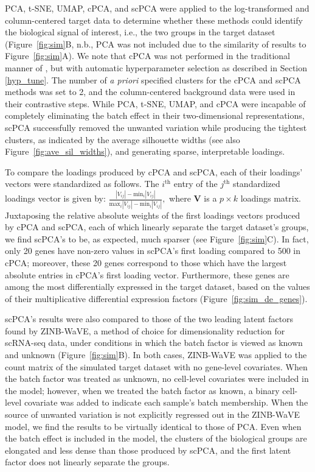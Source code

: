 PCA, t-SNE, UMAP, cPCA, and scPCA were applied to the log-transformed and column-centered target data to determine whether these methods could identify the biological signal of interest, i.e., the two groups in the target dataset (Figure~\ref{fig:sim}B, n.b., PCA was not included due to the similarity of results to Figure~\ref{fig:sim}A). We note that cPCA was not performed in the traditional manner of \citet{Abid2018}, but with automatic hyperparameter selection as described in Section \ref{hyp_tune}. The number of \textit{a priori} specified clusters for the cPCA and scPCA methods was set to 2, and the column-centered background data were used in their contrastive steps. While PCA, t-SNE, UMAP, and cPCA were incapable of completely eliminating the batch effect in their two-dimensional representations, scPCA successfully removed the unwanted variation while producing the tightest clusters, as indicated by the average silhouette widths (see also Figure~\ref{fig:ave_sil_widths}), and generating sparse, interpretable loadings.

To compare the loadings produced by cPCA and scPCA, each of their loadings' vectors were standardized as follows. The $i^{\text{th}}$ entry of the $j^{\text{th}}$ standardized loadings vector is given by: 
$
\frac{|V_{ij}| - \text{min}_i |V_{ij}|}{\text{max}_i |V_{ij}| - \text{min}_i |V_{ij}|},
$
where $\mathbf{V}$ is a $p \times k$ loadings matrix. 
Juxtaposing the relative absolute weights of the first loadings vectors produced by cPCA and scPCA, each of which linearly separate the target dataset's groups, we find scPCA's to be, as expected, much sparser (see Figure~\ref{fig:sim}C). In fact, only 20 genes have non-zero values in scPCA's first loading compared to 500 in cPCA; moreover, these 20 genes correspond to those which have the largest absolute entries in cPCA's first loading vector. Furthermore, these genes are among the most differentially expressed in the target dataset, based on the values of their multiplicative differential expression factors (Figure~\ref{fig:sim_de_genes}).

scPCA's results were also compared to those of the two leading latent factors found by ZINB-WaVE, a method of choice for dimensionality reduction for scRNA-seq data, under conditions in which the batch factor is viewed as known and unknown (Figure~\ref{fig:sim}B). In both cases, ZINB-WaVE was applied to the count matrix of the simulated target dataset with no gene-level covariates. When the batch factor was treated as unknown, no cell-level covariates were included in the model; however, when we treated the batch factor as known, a binary cell-level covariate was added to indicate each sample's batch membership. When the source of unwanted variation is not explicitly regressed out in the ZINB-WaVE model, we find the results to be virtually identical to those of PCA. Even when the batch effect is included in the model, the clusters of the biological groups are elongated and less dense than those produced by scPCA, and the first latent factor does not linearly separate the groups.


